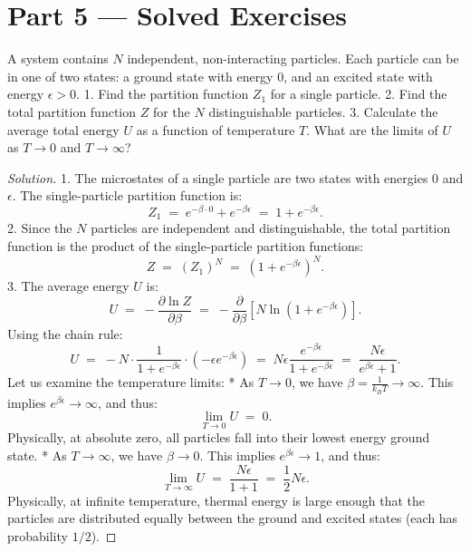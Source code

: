 \documentclass[12pt, a4paper, twoside]{book}
\begin{document}
\newpage

\section{Part 5 --- Solved Exercises}

\begin{exercise}
A system contains $N$ independent, non-interacting particles. Each particle can be in one of two states: a ground state with energy $0$, and an excited state with energy $\epsilon > 0$.
1. Find the partition function $Z_1$ for a single particle.
2. Find the total partition function $Z$ for the $N$ distinguishable particles.
3. Calculate the average total energy $U$ as a function of temperature $T$. What are the limits of $U$ as $T \to 0$ and $T \to \infty$?
\end{exercise}

\begin{proof}[Solution]
1. The microstates of a single particle are two states with energies $0$ and $\epsilon$. The single-particle partition function is:
\[
  Z_1 \;=\; e^{-\beta \cdot 0} + e^{-\beta \epsilon} \;=\; 1 + e^{-\beta \epsilon}.
\]
2. Since the $N$ particles are independent and distinguishable, the total partition function is the product of the single-particle partition functions:
\[
  Z \;=\; (Z_1)^N \;=\; (1 + e^{-\beta \epsilon})^N.
\]
3. The average energy $U$ is:
\[
  U \;=\; -\frac{\partial \ln Z}{\partial \beta} \;=\; -\frac{\partial}{\partial \beta} \left[ N \ln(1 + e^{-\beta \epsilon}) \right].
\]
Using the chain rule:
\[
  U \;=\; -N \cdot \frac{1}{1 + e^{-\beta \epsilon}} \cdot (-\epsilon e^{-\beta \epsilon}) \;=\; N \epsilon \frac{e^{-\beta \epsilon}}{1 + e^{-\beta \epsilon}} \;=\; \frac{N \epsilon}{e^{\beta \epsilon} + 1}.
\]
Let us examine the temperature limits:
* As $T \to 0$, we have $\beta = \frac{1}{k_B T} \to \infty$. This implies $e^{\beta \epsilon} \to \infty$, and thus:
\[
  \lim_{T\to 0} U \;=\; 0.
\]
Physically, at absolute zero, all particles fall into their lowest energy ground state.
* As $T \to \infty$, we have $\beta \to 0$. This implies $e^{\beta \epsilon} \to 1$, and thus:
\[
  \lim_{T\to \infty} U \;=\; \frac{N\epsilon}{1+1} \;=\; \frac{1}{2} N\epsilon.
\]
Physically, at infinite temperature, thermal energy is large enough that the particles are distributed equally between the ground and excited states (each has probability $1/2$).
\end{proof}
\end{document}

